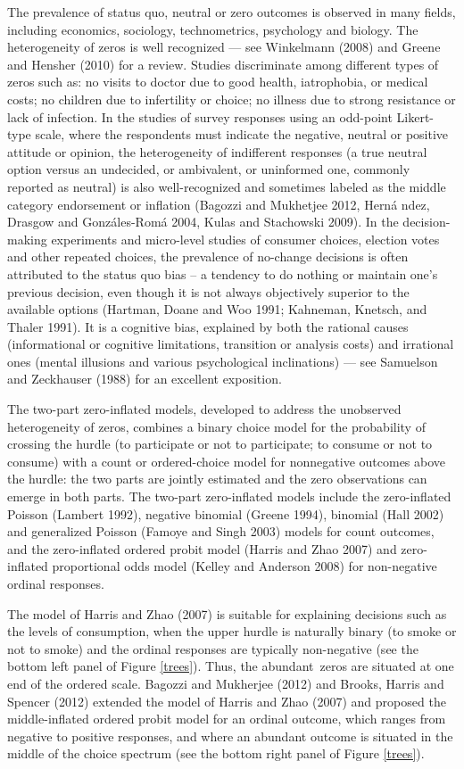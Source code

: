 \documentclass[letterpaper,fleqn,12pt]{article}
\begin{document}
\begin{onehalfspace}
The prevalence of status quo, neutral or zero outcomes is observed in many
fields, including economics, sociology, technometrics, psychology and
biology. The heterogeneity of zeros is well recognized --- see Winkelmann
(2008) and Greene and Hensher (2010) for a review. Studies discriminate
among different types of zeros such as: no visits to doctor due to good
health, iatrophobia, or medical costs; no children due to infertility or
choice; no illness due to strong resistance or lack of infection. In the
studies of survey responses using an odd-point Likert-type scale, where the
respondents must indicate the negative, neutral or positive attitude or
opinion, the heterogeneity of indifferent responses (a true neutral option
versus an undecided, or ambivalent, or uninformed one, commonly reported as
neutral) is also well-recognized and sometimes labeled as the middle
category endorsement or inflation (Bagozzi and Mukhetjee 2012, Hern\'{a}%
ndez, Drasgow and Gonz\'{a}les-Rom\'{a} 2004, Kulas and Stachowski 2009). In
the decision-making experiments and micro-level studies of consumer choices,
election votes and other repeated choices, the prevalence of no-change
decisions is often attributed to the status quo bias -- a tendency to do
nothing or maintain one's previous decision, even though it is not always
objectively superior to the available options (Hartman, Doane and Woo 1991;
Kahneman, Knetsch, and Thaler 1991). It is a cognitive bias, explained by
both the rational causes (informational or cognitive limitations, transition
or analysis costs) and irrational ones (mental illusions and various
psychological inclinations) --- see Samuelson and Zeckhauser (1988) for an
excellent exposition.

The two-part zero-inflated models, developed to address the unobserved
heterogeneity of zeros, combines a binary choice model for the probability
of crossing the hurdle (to participate or not to participate; to consume or
not to consume) with a count or ordered-choice model for nonnegative
outcomes above the hurdle: the two parts are jointly estimated and the zero
observations can emerge in both parts. The two-part zero-inflated models
include the zero-inflated Poisson (Lambert 1992), negative binomial (Greene
1994), binomial (Hall 2002) and generalized Poisson (Famoye and Singh 2003)
models for count outcomes, and the zero-inflated ordered probit model
(Harris and Zhao 2007) and zero-inflated proportional odds model (Kelley and
Anderson 2008) for non-negative ordinal responses.

The model of Harris and Zhao (2007) is suitable for explaining decisions
such as the levels of consumption, when the upper hurdle is naturally binary
(to smoke or not to smoke) and the ordinal responses are typically
non-negative (see the bottom left panel of Figure \ref{trees}). Thus, the
abundant\ zeros are situated at one end of the ordered scale. Bagozzi and
Mukherjee (2012) and Brooks, Harris and Spencer (2012) extended the model of
Harris and Zhao (2007) and proposed the middle-inflated ordered probit model
for an ordinal outcome, which ranges from negative to positive responses,
and where an abundant outcome is situated in the middle of the choice
spectrum (see the bottom right panel of Figure \ref{trees}). 


\end{onehalfspace}
\end{document}
